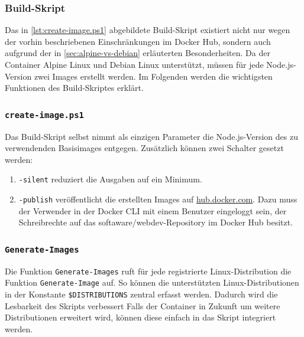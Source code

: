 \subsubsection{Build-Skript}

Das in \cref{lst:create-image.ps1} abgebildete Build-Skript existiert nicht nur wegen der vorhin beschriebenen Einschränkungen im Docker Hub, sondern auch aufgrund der in \cref{sec:alpine-vs-debian} erläuterten Besonderheiten.
Da der Container Alpine Linux und Debian Linux unterstützt, müssen für jede Node.js-Version zwei Images erstellt werden.
Im Folgenden werden die wichtigsten Funktionen des Build-Skriptes erklärt.


\subsubsection{\texttt{create-image.ps1}}
Das Build-Skript selbst nimmt als einzigen Parameter die Node.js-Version des zu verwendenden Basisimages entgegen.
Zusätzlich können zwei Schalter gesetzt werden:
\begin{enumerate}
    \item \verb|-silent| reduziert die Ausgaben auf ein Minimum.
    \item \verb|-publish| veröffentlicht die erstellten Images auf \url{hub.docker.com}.
        Dazu muss der Verwender in der Docker CLI mit einem Benutzer eingeloggt sein, der Schreibrechte auf das softaware/webdev-Repository im Docker Hub besitzt.
\end{enumerate}

\subsubsection{\texttt{Generate-Images}}
Die Funktion \verb|Generate-Images| ruft für jede registrierte Linux-Distribution die Funktion \verb|Generate-Image| auf.
So können die unterstützten Linux-Distributionen in der Konstante \verb|$DISTRIBUTIONS| zentral erfasst werden.
Dadurch wird die Lesbarkeit des Skripts verbessert
Falls der Container in Zukunft um weitere Distributionen erweitert wird, können diese einfach in das Skript integriert werden.

